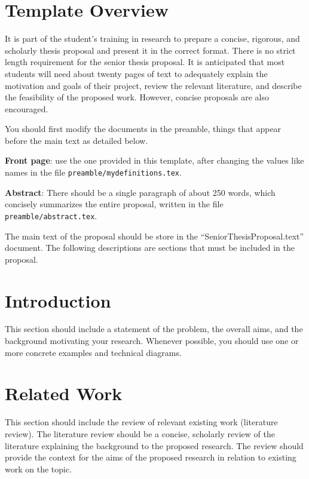\documentclass[12pt,oneside]{book} %
\begin{document}
\section*{Template Overview}

It is part of the student's training in research to prepare a concise, rigorous, and scholarly thesis proposal and present it in the correct format. There is no strict length requirement for the senior thesis proposal. It is anticipated that most students will need about twenty pages of text to adequately explain the motivation and goals of their project, review the relevant literature, and describe the feasibility of the proposed work. However, concise proposals are also encouraged. 

You should first modify the documents in the preamble, things that appear before the main text as detailed below. 

\textbf{Front page}: use the one provided in this template, after changing the values like names in the file \texttt{preamble/mydefinitions.tex}.

\textbf{Abstract}: There should be a single paragraph of about 250 words, which concisely summarizes the entire proposal, written in the file \texttt{preamble/abstract.tex}.

The main text of the proposal should be store in the ``SeniorThesisProposal.text'' document. The following descriptions are sections that must be included in the proposal.



\section*{Introduction}
\label{sec:introduction}

This section should include a statement of the problem, the overall aims, and the background motivating your research. Whenever possible, you should use one or more concrete examples
and technical diagrams.

\section*{Related Work}
\label{sec:relatedwork}

This section should include the review of relevant existing work (literature review). The literature review should be a concise, scholarly review of the literature explaining the background to the proposed research. The review should provide the context for the aims of the proposed research in relation to existing work on the topic. 
\end{document}

